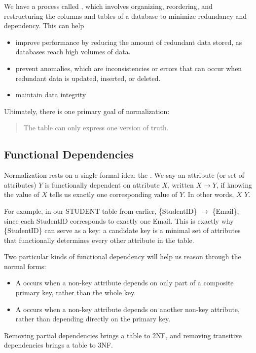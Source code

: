 We have a process called , which involves organizing, reordering, and restructuring the columns and tables of a database to minimize redundancy and dependency. This can help
\begin{itemize}
    \item improve performance by reducing the amount of redundant data stored, as databases reach high volumes of data.
    \item prevent anomalies, which are inconsistencies or errors that can occur when redundant data is updated, inserted, or deleted.
    \item maintain data integrity
\end{itemize}
Ultimately, there is one primary goal of normalization:
\begin{quote}
    The table can only express one version of truth.
\end{quote}

\subsection{Functional Dependencies}
Normalization rests on a single formal idea: the . We say an attribute (or set of attributes) $Y$ is functionally dependent on attribute $X$, written $X \rightarrow Y$, if knowing the value of $X$ tells us exactly one corresponding value of $Y$. In other words, $X$  $Y$.

For example, in our STUDENT table from earlier, \{StudentID\} $\rightarrow$ \{Email\}, since each StudentID corresponds to exactly one Email. This is exactly why \{StudentID\} can serve as a key: a candidate key is a minimal set of attributes that functionally determines every other attribute in the table.

Two particular kinds of functional dependency will help us reason through the normal forms:
\begin{itemize}
    \item A  occurs when a non-key attribute depends on only part of a composite primary key, rather than the whole key.
    \item A  occurs when a non-key attribute depends on another non-key attribute, rather than depending directly on the primary key.
\end{itemize}
Removing partial dependencies brings a table to 2NF, and removing transitive dependencies brings a table to 3NF.

